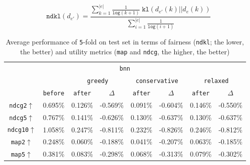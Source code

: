 \documentclass[runningheads]{llncs}
\begin{document}
\begin{equation}
\texttt{ndkl}(d_{e'}) = \frac{\sum_{k=1}^{|e|} \frac{1}{\texttt{log}(k+1)} \; \texttt{kl}(d_{e'}(k)||d_e(k))}{\sum_{i=1}^{|e|}\frac{1}{\texttt{log}(i+1)}}    
\end{equation}


\begin{table}[t]
\centering
\caption{Average performance of \texttt{5}-fold on test set in terms of fairness (\texttt{ndkl}; the lower, the better) and utility metrics (\texttt{map} and \texttt{ndcg}, the higher, the better) }
\vspace{-1em}
\begin{tabular}{cccccccc}\cline{3-8} 
\multicolumn{8}{c}{\texttt{bnn}\cite{DBLP:conf/cikm/DashtiSF22,DBLP:conf/cikm/RadFKSB20}}                                                                                                                                                \\ \cline{3-8} 
       &                                  & \multicolumn{2}{c|}{\texttt{greedy}}                 & \multicolumn{2}{c|}{\texttt{conservative}}              & \multicolumn{2}{c}{\texttt{relaxed}} \\ \cline{2-8} 
       & \multicolumn{1}{|c|}{\texttt{before}}      & \texttt{after}       & \multicolumn{1}{c|}{\texttt{\(\Delta \)}}        & \texttt{after}     & \multicolumn{1}{c|}{\texttt{\(\Delta \)}}             & \texttt{after}       & \texttt{\(\Delta \)}             \\ \hline \hline
\texttt{ndcg2$\uparrow$}  & \multicolumn{1}{|c|}{0.695\%}     & 0.126\%     & \multicolumn{1}{c|}{-0.569\%} & 0.091\%   & \multicolumn{1}{c|}{-0.604\%}      & 0.146\%      & -0.550\%      \\
\texttt{ndcg5$\uparrow$}  & \multicolumn{1}{|c|}{0.767\%}     & 0.141\%     & \multicolumn{1}{c|}{-0.626\%} & 0.130\%   & \multicolumn{1}{c|}{-0.637\%}      & 0.130\%      & -0.637\%      \\
\texttt{ndcg10$\uparrow$} & \multicolumn{1}{|c|}{1.058\%}     & 0.247\%     & \multicolumn{1}{c|}{-0.811\%} & 0.232\%   & \multicolumn{1}{c|}{-0.826\%}      & 0.246\%      & -0.812\%      \\\hline
\texttt{map2$\uparrow$}   & \multicolumn{1}{|c|}{0.248\%}     & 0.060\%     & \multicolumn{1}{c|}{-0.188\%} & 0.041\%   & \multicolumn{1}{c|}{-0.207\%}      & 0.063\%      & -0.185\%      \\
\texttt{map5$\uparrow$}   & \multicolumn{1}{|c|}{0.381\%}     & 0.083\%     & \multicolumn{1}{c|}{-0.298\%} & 0.068\%   & \multicolumn{1}{c|}{-0.313\%}      & 0.079\%      & -0.302\%      \\

\end{tabular}
\end{table}
\end{document}
